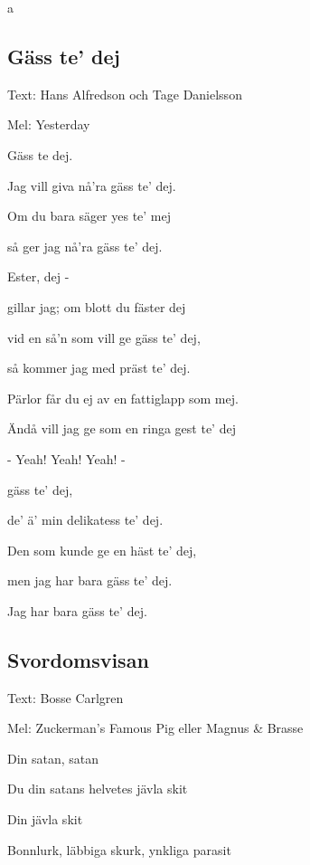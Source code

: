 a

\pagestyle{Övriga visor}



\subsection{\textbf{Gäss te’ dej}}

Text: Hans Alfredson och Tage Danielsson

Mel: Yesterday \bigskip


Gäss te dej.

Jag vill giva nå’ra gäss te’ dej.

Om du bara säger yes te’ mej

så ger jag nå’ra gäss te’ dej.

Ester, dej -

gillar jag; om blott du fäster dej

vid en så’n som vill ge gäss te’ dej,

så kommer jag med präst te’ dej. \bigskip



Pärlor får du ej av en fattiglapp som mej.

Ändå vill jag ge som en ringa gest te’ dej

- Yeah! Yeah! Yeah! - \bigskip



gäss te’ dej,

de’ ä’ min delikatess te’ dej.

Den som kunde ge en häst te’ dej,

men jag har bara gäss te’ dej.

Jag har bara gäss te’ dej. \bigskip

\subsection{\textbf{Svordomsvisan}}

Text: Bosse Carlgren

Mel: Zuckerman’s Famous Pig eller Magnus \& Brasse\bigskip

Din satan, satan

Du din satans helvetes jävla skit

Din jävla skit\bigskip



Bonnlurk, läbbiga skurk, ynkliga parasit

